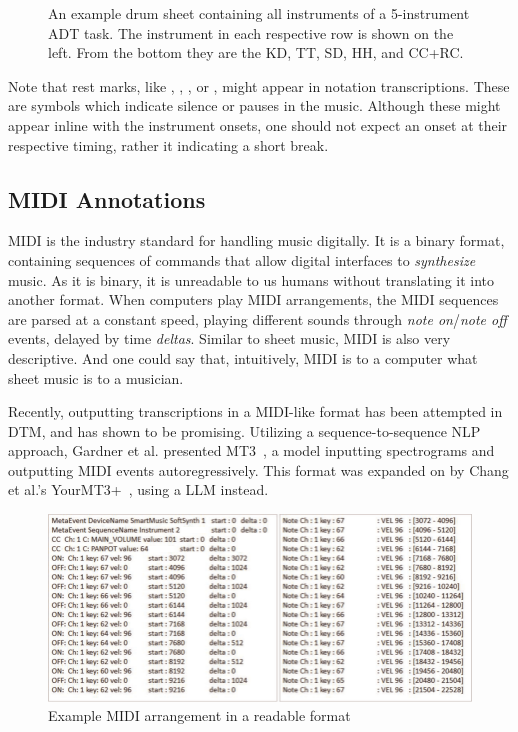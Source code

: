 \begin{figure}[H]
    \centering
    
    \caption{An example drum sheet containing all instruments of a 5-instrument \gls{ADT} task. The instrument in each respective row is shown on the left. From the bottom they are the \acrfull{KD}, \acrfull{TT}, \acrfull{SD}, \acrfull{HH}, and \acrfull{CC+RC}.}
    \label{DrumsheetFigure}
\end{figure}

Note that rest marks, like \HaPa, \ViPa, \AcPa, or \SePa, might appear in notation transcriptions. These are symbols which indicate silence or pauses in the music. Although these might appear inline with the instrument onsets, one should not expect an onset at their respective timing, rather it indicating a short break.

\subsection{MIDI Annotations}

\gls{MIDI} is the industry standard for handling music digitally. It is a binary format, containing sequences of commands that allow digital interfaces to \textit{synthesize} music. As it is binary, it is unreadable to us humans without translating it into another format. When computers play \gls{MIDI} arrangements, the \gls{MIDI} sequences are parsed at a constant speed, playing different sounds through \textit{note on}/\textit{note off} events, delayed by time \textit{deltas}. Similar to sheet music, \gls{MIDI} is also very descriptive. And one could say that, intuitively, \gls{MIDI} is to a computer what sheet music is to a musician.

Recently, outputting transcriptions in a \gls{MIDI}-like format has been attempted in \gls{DTM}, and has shown to be promising. Utilizing a sequence-to-sequence \gls{NLP} approach, Gardner et al. presented MT3~\cite{gardner2022mt3multitaskmultitrackmusic}, a model inputting spectrograms and outputting \gls{MIDI} events autoregressively. This format was expanded on by Chang et al.'s YourMT3+~\cite{chang2024yourmt3+}, using a \gls{LLM} instead.

\begin{figure}[H]
    \centering
    \includegraphics[scale=0.6, trim={0 0 13.8cm 0},clip]{figures/midi}
    \caption{Example MIDI arrangement in a readable format}
    \label{MIDIFigure}
\end{figure}

